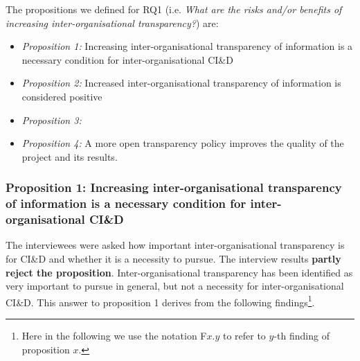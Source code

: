 The propositions we defined for  
RQ1 (i.e. {\em What are the risks and/or benefits of increasing inter-organisational transparency?}) are:

\begin{itemize}
\item %
\emph{Proposition 1:} Increasing inter-organisational transparency of information is a necessary condition for inter-organisational CI\&D
\item %
\emph{Proposition 2:} Increased inter-organisational transparency of information is considered positive
\item %
\emph{Proposition 3:}  
\item %
\emph{Proposition 4:} A more open transparency policy improves the quality of the project and its results.
\end{itemize}

\subsubsection{Proposition 1: Increasing inter-organisational transparency of information is a necessary condition for inter-organisational CI\&D}

The interviewees were asked how important inter-organisational transparency is for CI\&D and whether it is a necessity to pursue. 
The interview results {\bf partly reject the proposition}. 
Inter-organisational transparency has been identified as very important to pursue in general, but not a necessity for inter-organisational CI\&D. 
This answer to proposition 1 derives from the following findings\footnote{Here in the following we use the notation F$x$.$y$ to refer to $y$-th finding of proposition $x$.}.

